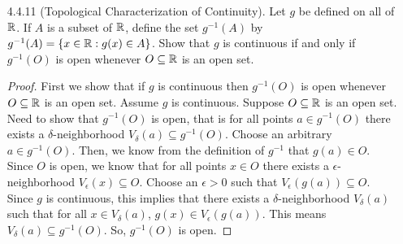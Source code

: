 \documentclass[12pt,letterpaper]{article}
\begin{document}
\begin{itemize}[leftmargin=!,labelindent=5pt]
            Yes
            \begin{proof}
                Assume $f$ is uniformly continuous on a bounded set $A$.
                Need to show that $f(A)$ is bounded.
                Let $\epsilon > 0$ be arbitrary.
                Since $f$ is uniformly continuous, there exists a $\delta > 0$ such that $\abs{x-y} < \delta$ implies $\abs{f(x) - f(y)} < \epsilon$ for $x,y \in A$.
                Since $A$ is bounded, there are a finite set of points $\{x_1, ..., x_n\}$ such that $\bigcup_{1 \leq i \leq n}(x_i - \delta, x_i + \delta)$ is a finite open cover of $A$.
                This means $\{f(x_1), ..., f(x_n)\}$ is also finite. 
                Thus, since it's finite $f(A)$ is necessarily bounded as desired.
            \end{proof}
        \item [4.4.11] (Topological Characterization of Continuity). Let $g$ be defined on all of $\mathbb{R}$. If $A$ is a subset of $\mathbb{R}$, define the set $g^{-1}(A)$ by $g^{-1}(A) = \{x \in \mathbb{R} : g(x) \in A\}$. Show that $g$ is continuous if and only if $g^{-1}(O)$ is open whenever $O \subseteq \mathbb{R}$ is an open set.
            \begin{proof}
                First we show that if $g$ is continuous then $g^{-1}(O)$ is open whenever $O \subseteq \mathbb{R}$ is an open set.
                Assume $g$ is continuous.
                Suppose $O \subseteq \mathbb{R}$ is an open set.
                Need to show that $g^{-1}(O)$ is open, that is for all points $a \in g^{-1}(O)$ there exists a $\delta$-neighborhood $V_\delta(a) \subseteq g^{-1}(O)$.
                Choose an arbitrary $a \in g^{-1}(O)$.
                Then, we know from the definition of $g^{-1}$ that $g(a) \in O$.
                Since $O$ is open, we know that for all points $x \in O$ there exists a $\epsilon$-neighborhood $V_\epsilon(x) \subseteq O$.
                Choose an $\epsilon > 0$ such that $V_\epsilon(g(a)) \subseteq O$.
                Since $g$ is continuous, this implies that there exists a $\delta$-neighborhood $V_\delta(a)$ such that for all $x \in V_\delta(a)$, $g(x) \in V_\epsilon(g(a))$.
                This means $V_\delta(a) \subseteq g^{-1}(O)$.
                So, $g^{-1}(O)$ is open.


\end{proof}
\end{itemize}
\end{document}
